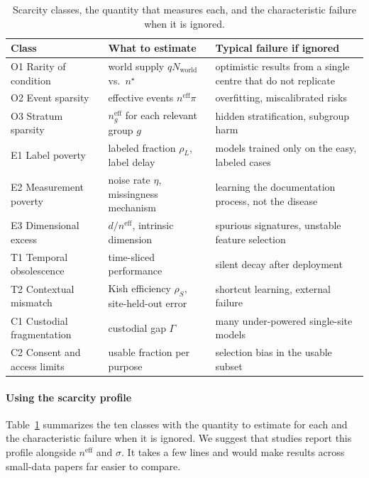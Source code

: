 \documentclass[acmsmall,screen,review]{acmart}
\newcommand{\eff}{\mathrm{eff}}
\theoremstyle{acmdefinition}
\begin{document}
\begin{table}[t]
\caption{Scarcity classes, the quantity that measures each, and the characteristic failure when it is ignored.}
\label{tab:scarcity}
\small
\begin{tabularx}{\linewidth}{@{}lXX@{}}
\toprule
Class & What to estimate & Typical failure if ignored\\
\midrule
O1 Rarity of condition & world supply $qN_{\mathrm{world}}$ vs.\ $n^{\star}$ & optimistic results from a single centre that do not replicate\\
O2 Event sparsity & effective events $n^{\eff}\pi$ & overfitting, miscalibrated risks \cite{riley2019minimumsample}\\
O3 Stratum sparsity & $n^{\eff}_g$ for each relevant group $g$ & hidden stratification, subgroup harm \cite{oakdenrayner2020hidden}\\
E1 Label poverty & labeled fraction $\rho_L$, label delay & models trained only on the easy, labeled cases\\
E2 Measurement poverty & noise rate $\eta$, missingness mechanism & learning the documentation process, not the disease\\
E3 Dimensional excess & $d/n^{\eff}$, intrinsic dimension & spurious signatures, unstable feature selection\\
T1 Temporal obsolescence & time-sliced performance & silent decay after deployment\\
T2 Contextual mismatch & Kish efficiency $\rho_S$, site-held-out error & shortcut learning, external failure \cite{zech2018variable}\\
C1 Custodial fragmentation & custodial gap $\Gamma$ & many under-powered single-site models\\
C2 Consent and access limits & usable fraction per purpose & selection bias in the usable subset\\
\bottomrule
\end{tabularx}
\end{table}

\paragraph{Using the scarcity profile} Table~\ref{tab:scarcity} summarizes the ten classes with the quantity to estimate for each and the characteristic failure when it is ignored. We suggest that studies report this profile alongside $n^{\eff}$ and $\sigma$. It takes a few lines and would make results across small-data papers far easier to compare.
\end{document}
